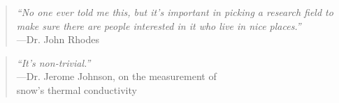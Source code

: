 \vspace{2in}

\begin{quotation}
  {\it ``No one ever told me this, but it's important in picking a research field to make sure there are people interested in it who live in nice places.''} \\
  \hspace*{1in}---Dr. John Rhodes
\end{quotation}

\vspace{1in}

\begin{quotation}
  {\it ``It's non-trivial.''} \\ 
  \hspace*{1in}---Dr. Jerome Johnson, on the measurement of\\ 
  \hspace*{1.1in}snow's thermal conductivity
\end{quotation}
